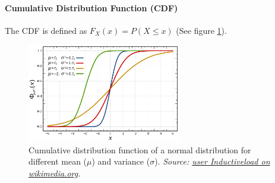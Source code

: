 \documentclass[../main.tex]{subfiles}
\begin{document}
        \paragraph{Cumulative Distribution Function (CDF)}  The CDF is defined as $F_X(x) = P(X \leq x)$ (See figure \ref{CDF}).
                \begin{figure}
                    \centering  
                    \includegraphics[width=0.6\textwidth]{../figures/Normal_Distribution_CDF.png}
                    \caption{Cumulative distribution function of a normal distribution for different mean ($\mu$) and variance ($\sigma$). \textit{Source: \href{https://commons.wikimedia.org/wiki/File:Normal_Distribution_CDF.svg}{user Inductiveload on wikimedia.org}.}}
                    \label{CDF}
                \end{figure}
\end{document}
